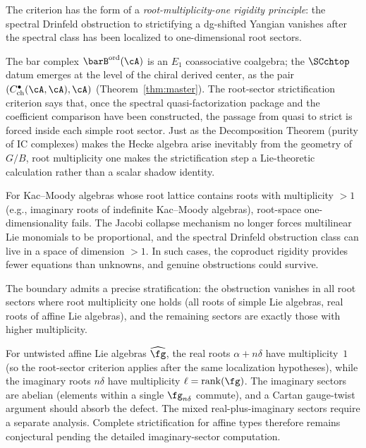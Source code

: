 \begin{remark}
The criterion has the form of a
\emph{root-multiplicity-one rigidity principle}: the spectral
Drinfeld obstruction to strictifying a dg-shifted Yangian vanishes
after the spectral class has been localized to one-dimensional root
sectors.

The bar complex $\barB^{\mathrm{ord}}(\cA)$ is an $E_1$ coassociative
coalgebra; the $\SCchtop$ datum emerges at the level of the chiral
derived center, as the pair $(C^\bullet_{\mathrm{ch}}(\cA,\cA),\cA)$
(Theorem~\ref{thm:master}). The root-sector strictification criterion
says that, once the spectral quasi-factorization package and the
coefficient comparison have been constructed, the passage from quasi
to strict is forced inside each simple root sector. Just as the
Decomposition Theorem (purity of IC complexes) makes the Hecke algebra
arise inevitably from the geometry of $G/B$, root multiplicity one
makes the strictification step a Lie-theoretic calculation rather
than a scalar shadow identity.
\end{remark}

\begin{remark}
\label{rem:kac-moody-failure}
For Kac--Moody algebras whose root lattice contains roots with
multiplicity $>1$ (e.g., imaginary roots of indefinite Kac--Moody
algebras), root-space one-dimensionality fails. The Jacobi collapse
mechanism no longer forces multilinear Lie monomials to be
proportional, and the spectral Drinfeld obstruction class can live in
a space of dimension $>1$. In such cases, the coproduct rigidity
provides fewer equations than unknowns, and genuine obstructions
could survive.

The boundary admits a precise stratification: the obstruction vanishes
in all root sectors where root multiplicity one holds (all roots of
simple Lie algebras, real roots of affine Lie algebras), and the
remaining sectors are exactly those with higher multiplicity.

For untwisted affine Lie algebras $\widehat\fg$, the real roots
$\alpha+n\delta$ have multiplicity~$1$ (so the root-sector criterion
applies after the same localization hypotheses), while the imaginary roots $n\delta$ have
multiplicity $\ell=\operatorname{rank}(\fg)$. The imaginary sectors
are abelian (elements within a single $\fg_{n\delta}$ commute), and
a Cartan gauge-twist argument should absorb the defect. The mixed
real-plus-imaginary sectors require a separate analysis. Complete
strictification for affine types therefore remains conjectural pending
the detailed imaginary-sector computation.
\end{remark}

